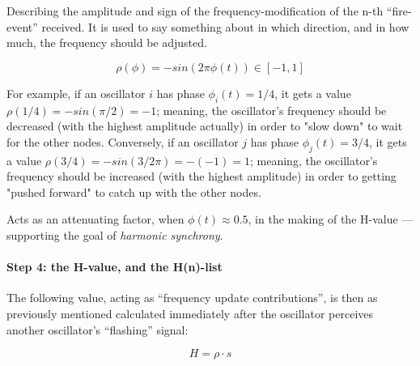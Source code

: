 		Describing the amplitude and sign of the frequency-modification of the n-th ``fire-event'' received. It is used to say something about in which direction, and in how much, the frequency should be adjusted.

		\begin{equation}
		\label{amp_sign_freq_adj}
			\rho(\phi) = - sin(2\pi\phi(t)) \in [-1, 1]
		\end{equation}


		For example, if an oscillator $i$ has phase $\phi_i(t)=1/4$, it gets a value $\rho(1/4) = - sin(\pi/2) = -1$; meaning, the oscillator's frequency should be decreased (with the highest amplitude actually) in order to "slow down" to wait for the other nodes. Conversely, if an oscillator $j$ has phase $\phi_j(t)=3/4$, it gets a value $\rho(3/4) = - sin(3/2 \pi) = -(-1) = 1$; meaning, the oscillator's frequency should be increased (with the highest amplitude) in order to getting "pushed forward" to catch up with the other nodes.

		Acts as an attenuating factor, when $\phi(t)\approx0.5$, in the making of the H-value — supporting the goal of \textit{harmonic synchrony}.
		

		\paragraph{Step 4: the H-value, and the H(n)-list}
		\label{H_n}

		The following value, acting as ``frequency update contributions'', is then as previously mentioned calculated immediately after the oscillator perceives another oscillator's ``flashing'' signal:

		\begin{equation}
		\label{h_value}
			H = \rho \cdot s
		\end{equation}

